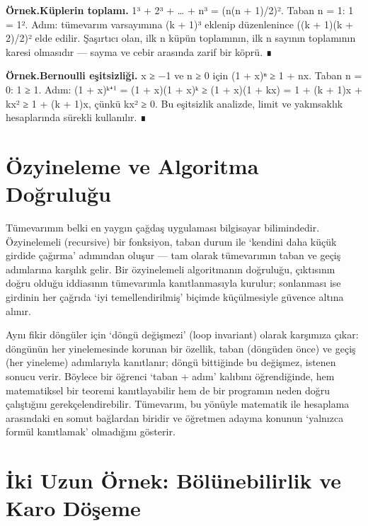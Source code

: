 \begin{tcolorbox}[bookbox,colback=cEx]\textbf{\textsf{\textcolor{cAcc}{Örnek.}}}\quad \textbf{Küplerin toplamı. }1³ + 2³ + … + n³ = (n(n + 1)/2)². Taban n = 1: 1 = 1². Adım: tümevarım varsayımına (k + 1)³ eklenip düzenlenince ((k + 1)(k + 2)/2)² elde edilir. Şaşırtıcı olan, ilk n küpün toplamının, ilk n sayının toplamının karesi olmasıdır — sayma ve cebir arasında zarif bir köprü. ∎\end{tcolorbox}

\begin{tcolorbox}[bookbox,colback=cEx]\textbf{\textsf{\textcolor{cAcc}{Örnek.}}}\quad \textbf{Bernoulli eşitsizliği. }x ≥ −1 ve n ≥ 0 için (1 + x)ⁿ ≥ 1 + nx. Taban n = 0: 1 ≥ 1. Adım: (1 + x)ᵏ⁺¹ = (1 + x)(1 + x)ᵏ ≥ (1 + x)(1 + kx) = 1 + (k + 1)x + kx² ≥ 1 + (k + 1)x, çünkü kx² ≥ 0. Bu eşitsizlik analizde, limit ve yakınsaklık hesaplarında sürekli kullanılır. ∎\end{tcolorbox}

\section{Özyineleme ve Algoritma Doğruluğu}

Tümevarımın belki en yaygın çağdaş uygulaması bilgisayar bilimindedir. Özyinelemeli (recursive) bir fonksiyon, taban durum ile ‘kendini daha küçük girdide çağırma’ adımından oluşur — tam olarak tümevarımın taban ve geçiş adımlarına karşılık gelir. Bir özyinelemeli algoritmanın doğruluğu, çıktısının doğru olduğu iddiasının tümevarımla kanıtlanmasıyla kurulur; sonlanması ise girdinin her çağrıda ‘iyi temellendirilmiş’ biçimde küçülmesiyle güvence altına alınır.

Aynı fikir döngüler için ‘döngü değişmezi’ (loop invariant) olarak karşımıza çıkar: döngünün her yinelemesinde korunan bir özellik, taban (döngüden önce) ve geçiş (her yineleme) adımlarıyla kanıtlanır; döngü bittiğinde bu değişmez, istenen sonucu verir. Böylece bir öğrenci ‘taban + adım’ kalıbını öğrendiğinde, hem matematiksel bir teoremi kanıtlayabilir hem de bir programın neden doğru çalıştığını gerekçelendirebilir. Tümevarım, bu yönüyle matematik ile hesaplama arasındaki en somut bağlardan biridir ve öğretmen adayına konunun ‘yalnızca formül kanıtlamak’ olmadığını gösterir.

\section{İki Uzun Örnek: Bölünebilirlik ve Karo Döşeme}

